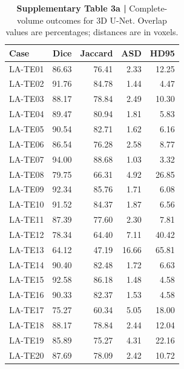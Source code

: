 \documentclass[11pt,a4paper]{article}
\begin{document}
\begin{table}[H]\centering\sffamily\footnotesize
\caption*{\textbf{Supplementary Table 3a | }Complete-volume outcomes for 3D U-Net. Overlap values are percentages; distances are in voxels.}
\setlength{\tabcolsep}{5pt}\renewcommand{\arraystretch}{1.18}
\begin{tabular}{lrrrr}
\toprule
Case & Dice & Jaccard & ASD & HD95 \\
\midrule
LA-TE01 & 86.63 & 76.41 & 2.33 & 12.25 \\
LA-TE02 & 91.76 & 84.78 & 1.44 & 4.47 \\
LA-TE03 & 88.17 & 78.84 & 2.49 & 10.30 \\
LA-TE04 & 89.47 & 80.94 & 1.81 & 5.83 \\
LA-TE05 & 90.54 & 82.71 & 1.62 & 6.16 \\
LA-TE06 & 86.54 & 76.28 & 2.58 & 8.77 \\
LA-TE07 & 94.00 & 88.68 & 1.03 & 3.32 \\
LA-TE08 & 79.75 & 66.31 & 4.92 & 26.85 \\
LA-TE09 & 92.34 & 85.76 & 1.71 & 6.08 \\
LA-TE10 & 91.52 & 84.37 & 1.87 & 6.56 \\
LA-TE11 & 87.39 & 77.60 & 2.30 & 7.81 \\
LA-TE12 & 78.34 & 64.40 & 7.11 & 40.42 \\
LA-TE13 & 64.12 & 47.19 & 16.66 & 65.81 \\
LA-TE14 & 90.40 & 82.48 & 1.72 & 6.63 \\
LA-TE15 & 92.58 & 86.18 & 1.48 & 4.58 \\
LA-TE16 & 90.33 & 82.37 & 1.53 & 4.58 \\
LA-TE17 & 75.27 & 60.34 & 5.05 & 18.00 \\
LA-TE18 & 88.17 & 78.84 & 2.44 & 12.04 \\
LA-TE19 & 85.89 & 75.27 & 4.31 & 22.16 \\
LA-TE20 & 87.69 & 78.09 & 2.42 & 10.72 \\
\bottomrule\end{tabular}\end{table}

\clearpage
\end{document}
